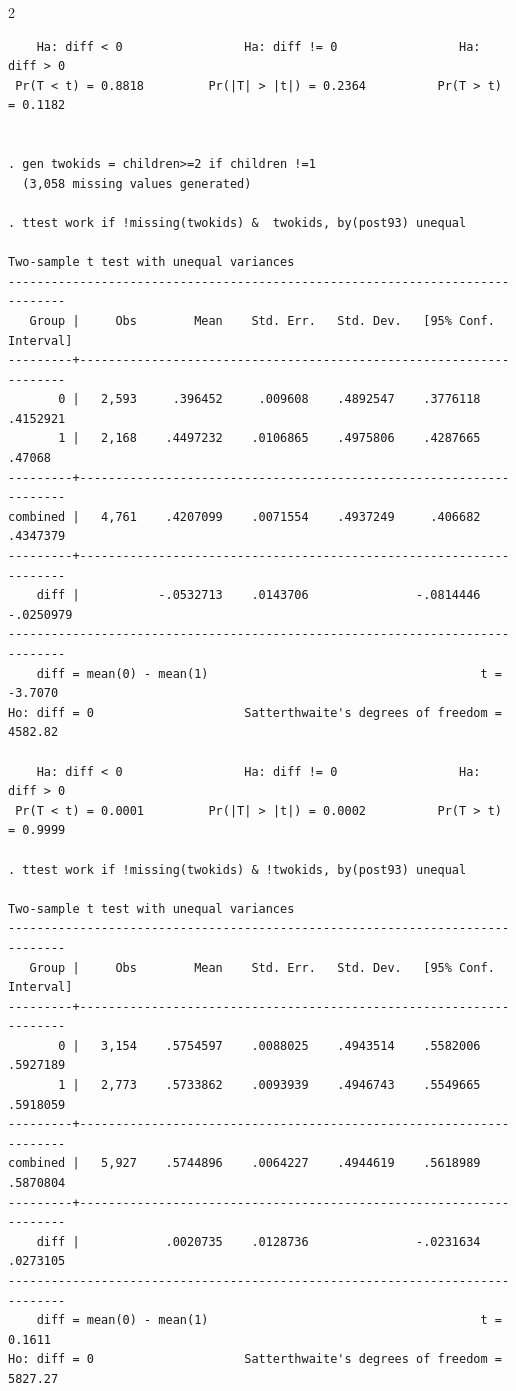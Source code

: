 \documentclass{article}
\newenvironment{changemargin}[2]{%
\begin{list}{}{%
\setlength{\topsep}{0pt}%
\setlength{\leftmargin}{#1}%
\setlength{\rightmargin}{#2}%
\setlength{\listparindent}{\parindent}%
\setlength{\itemindent}{\parindent}%
\setlength{\parsep}{\parskip}%
}%
\item[]}{\end{list}}
\begin{document}
\begin{changemargin}{-0.5in}{-0.5in}
\begin{multicols}{2}
\begin{verbatim}
    Ha: diff < 0                 Ha: diff != 0                 Ha: diff > 0
 Pr(T < t) = 0.8818         Pr(|T| > |t|) = 0.2364          Pr(T > t) = 0.1182


. gen twokids = children>=2 if children !=1
  (3,058 missing values generated)

. ttest work if !missing(twokids) &  twokids, by(post93) unequal

Two-sample t test with unequal variances
------------------------------------------------------------------------------
   Group |     Obs        Mean    Std. Err.   Std. Dev.   [95% Conf. Interval]
---------+--------------------------------------------------------------------
       0 |   2,593     .396452     .009608    .4892547    .3776118    .4152921
       1 |   2,168    .4497232    .0106865    .4975806    .4287665      .47068
---------+--------------------------------------------------------------------
combined |   4,761    .4207099    .0071554    .4937249     .406682    .4347379
---------+--------------------------------------------------------------------
    diff |           -.0532713    .0143706               -.0814446   -.0250979
------------------------------------------------------------------------------
    diff = mean(0) - mean(1)                                      t =  -3.7070
Ho: diff = 0                     Satterthwaite's degrees of freedom =  4582.82

    Ha: diff < 0                 Ha: diff != 0                 Ha: diff > 0
 Pr(T < t) = 0.0001         Pr(|T| > |t|) = 0.0002          Pr(T > t) = 0.9999

. ttest work if !missing(twokids) & !twokids, by(post93) unequal

Two-sample t test with unequal variances
------------------------------------------------------------------------------
   Group |     Obs        Mean    Std. Err.   Std. Dev.   [95% Conf. Interval]
---------+--------------------------------------------------------------------
       0 |   3,154    .5754597    .0088025    .4943514    .5582006    .5927189
       1 |   2,773    .5733862    .0093939    .4946743    .5549665    .5918059
---------+--------------------------------------------------------------------
combined |   5,927    .5744896    .0064227    .4944619    .5618989    .5870804
---------+--------------------------------------------------------------------
    diff |            .0020735    .0128736               -.0231634    .0273105
------------------------------------------------------------------------------
    diff = mean(0) - mean(1)                                      t =   0.1611
Ho: diff = 0                     Satterthwaite's degrees of freedom =  5827.27


\end{verbatim}
\end{multicols}
\end{changemargin}
\end{document}
